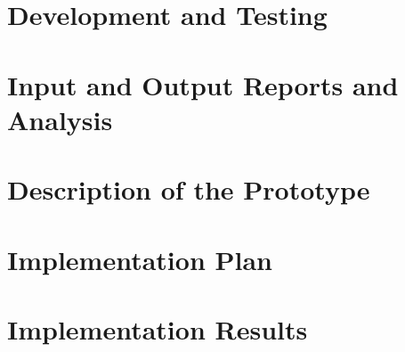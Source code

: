 \section{Development and Testing}

\section{Input and Output Reports and Analysis}

\section{Description of the Prototype}

\section{Implementation Plan}

\section{Implementation Results}
